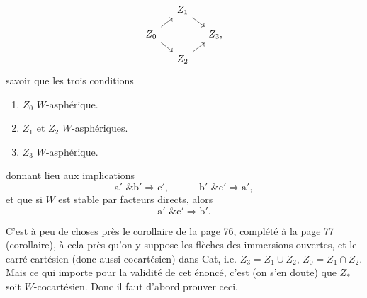 \[
\begin{tikzcd}[ampersand replacement=\&, row sep=small, column sep=small]
 \& Z_1 \arrow[dr] \& \\
Z_0 \arrow[ur] \arrow[dr] \& \& Z_3, \\
 \& Z_2 \arrow[ur] \&
\end{tikzcd}
\]
savoir que les trois conditions
\begin{enumerate}[label={}]
\item[a$'$)] $Z_0$ $W$-asphérique.
\item[b$'$)] $Z_1$ et $Z_2$ $W$-asphériques.
\item[c$'$)] $Z_3$ $W$-asphérique.
\end{enumerate}
donnant lieu aux implications
\[
\mathrm{a}' \text{ \& } \mathrm{b}' \Longrightarrow \mathrm{c}', \qquad\quad \mathrm{b}' \text{ \& } \mathrm{c}' \Longrightarrow \mathrm{a}',
\]
et que si $W$ est stable par facteurs directs, alors
\[
\mathrm{a}' \text{ \& } \mathrm{c}' \Longrightarrow \mathrm{b}'.
\]

C'est à peu de choses près le corollaire de la page 76, complété à la page 77 (corollaire), à cela près qu'on y suppose les flèches des immersions ouvertes, et le carré cartésien (donc aussi cocartésien) dans Cat, i.e. $Z_3 = Z_1 \cup Z_2$, $Z_0 = Z_1 \cap Z_2$. Mais
ce qui importe pour la validité de cet énoncé, c'est (on s'en doute) que $Z_*$ soit $W$-cocartésien. Donc il faut d'abord prouver ceci.

